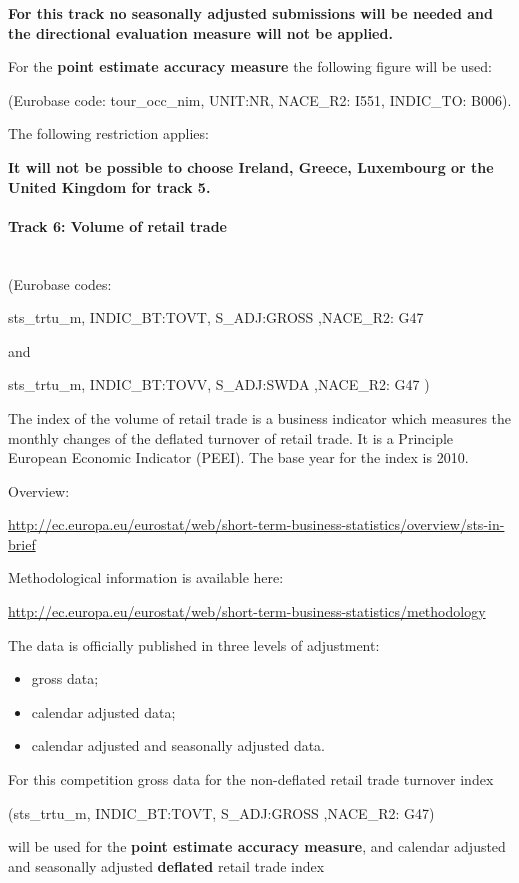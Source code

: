 \documentclass[12pt]{article}
\begin{document}
\textbf{For this track no seasonally adjusted submissions will be needed and the directional evaluation measure will not be applied.}


For the \textbf{point estimate accuracy measure} the following figure will be used:

(Eurobase code: tour\_occ\_nim, UNIT:NR, NACE\_R2: I551, INDIC\_TO: B006).


The following restriction applies:


\textbf{It will not be possible to choose Ireland, Greece, Luxembourg or the United Kingdom for track 5.}

\paragraph{Track 6: Volume of retail trade}
\textbf{ }\\
(Eurobase codes:

 sts\_trtu\_m, INDIC\_BT:TOVT, S\_ADJ:GROSS ,NACE\_R2: G47

and

sts\_trtu\_m, INDIC\_BT:TOVV, S\_ADJ:SWDA ,NACE\_R2: G47
)

The index of the volume of retail trade is a business indicator which measures the monthly changes of the deflated turnover of retail trade. It is a Principle European Economic Indicator (PEEI). The base year for the index is 2010. 

Overview:

\url{http://ec.europa.eu/eurostat/web/short-term-business-statistics/overview/sts-in-brief}

Methodological information is available here:

\url{http://ec.europa.eu/eurostat/web/short-term-business-statistics/methodology}

The data is officially published in three levels of adjustment:

\begin{itemize}
\item{gross data;}
\item{calendar adjusted data;}
\item{calendar adjusted and seasonally adjusted data.}
\end{itemize}


For this competition gross data for the non-deflated retail trade turnover index 

(sts\_trtu\_m, INDIC\_BT:TOVT, S\_ADJ:GROSS ,NACE\_R2: G47) 

will be used for the \textbf{point estimate accuracy measure}, and calendar adjusted and seasonally adjusted \textbf{deflated} retail trade index  
\end{document}
